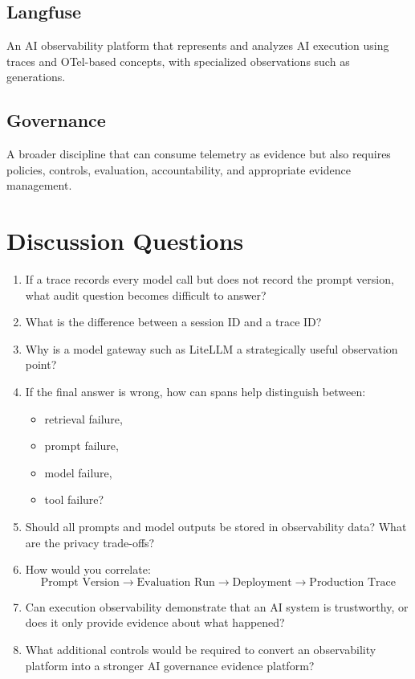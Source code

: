 \documentclass[11pt,a4paper]{article}
\begin{document}
\subsection*{Langfuse}

An AI observability platform that represents and analyzes AI execution using traces and OTel-based concepts, with specialized observations such as generations.

\subsection*{Governance}

A broader discipline that can consume telemetry as evidence but also requires policies, controls, evaluation, accountability, and appropriate evidence management.

\section{Discussion Questions}

\begin{enumerate}
\item If a trace records every model call but does not record the prompt version, what audit question becomes difficult to answer?

\item What is the difference between a session ID and a trace ID?

\item Why is a model gateway such as LiteLLM a strategically useful observation point?

\item If the final answer is wrong, how can spans help distinguish between:
\begin{itemize}
    \item retrieval failure,
    \item prompt failure,
    \item model failure,
    \item tool failure?
\end{itemize}

\item Should all prompts and model outputs be stored in observability data? What are the privacy trade-offs?

\item How would you correlate:
\[
\text{Prompt Version} \rightarrow \text{Evaluation Run} \rightarrow \text{Deployment} \rightarrow \text{Production Trace}
\]

\item Can execution observability demonstrate that an AI system is trustworthy, or does it only provide evidence about what happened?

\item What additional controls would be required to convert an observability platform into a stronger AI governance evidence platform?

\end{enumerate}
\end{document}
